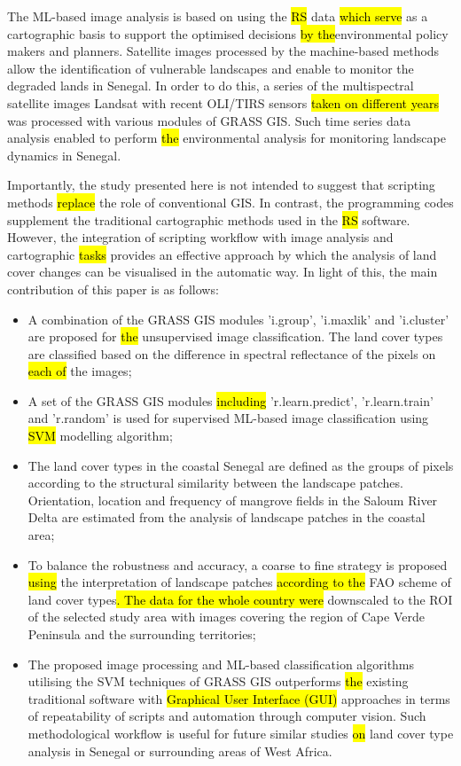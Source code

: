 \documentclass[earth,article,submit,pdftex,moreauthors]{Definitions/mdpi}
\begin{document}
{The ML-based image analysis is based on using the }\hl{RS} data \hl{which serve} as a cartographic basis to support the\hl{ }optimised decisions \hl{by the}environmental policy makers and planners{. Satellite images processed by the machine-based methods allow }the identification of vulnerable landscapes and {enable} to monitor {the }degraded lands in Senegal. {In order to do this}, a series of the multispectral satellite images Landsat with recent OLI/TIRS sensors \hl{taken on different years} was processed with various modules of GRASS GIS{. Such time series data analysis\hl{ }enabled to perform \hl{the }environmental } analysis for monitoring landscape dynamics in Senegal. 

Importantly, the study presented here is not intended to suggest that scripting methods \hl{replace }{the role of conventional GIS}. In contrast, the programming codes{ }supplement the traditional cartographic methods used in the \hl{RS} software. However, the integration of scripting workflow with image analysis\hl{ }and cartographic \hl{tasks} provides an effective approach by which the analysis of land cover changes can be visualised in the automatic way. {In light of this, }the main contribution of this paper is as follows: 

\begin{itemize}
  \item A combination of the GRASS GIS modules 'i.group', 'i.maxlik' and 'i.cluster' are proposed for \hl{the }{unsupervised }image classification. The land cover types are classified based on the difference in spectral reflectance of the pixels on \hl{each of }the images;
  \item {A set of the GRASS GIS modules \hl{including} 'r.learn.predict', 'r.learn.train' and 'r.random' is used for supervised ML-based image classification using \hl{SVM} modelling algorithm;}
  \item The land cover types in the coastal Senegal are defined as the groups of pixels according to the structural similarity between the landscape patches. Orientation, location and frequency of mangrove fields in the Saloum River Delta are estimated from the analysis of landscape patches in the coastal area;
  \item To balance {the} robustness and accuracy, a coarse to fine strategy is proposed \hl{using} the interpretation of landscape patches \hl{according to the} FAO scheme of land cover types\hl{. The data for the whole country were} downscaled to the ROI of the selected study area with images covering the region of Cape Verde Peninsula and the surrounding territories;
  \item The proposed image processing and {ML-based }classification algorithms utilising the {SVM techniques of }GRASS GIS outperforms \hl{the }existing traditional software with \hl{Graphical User Interface (GUI)} approaches in terms of repeatability of scripts and automation {through computer vision. Such methodological workflow }is useful for future similar studies \hl{on} land cover type analysis in Senegal {or surrounding areas of West Africa}.
\end{itemize}
\end{document}
